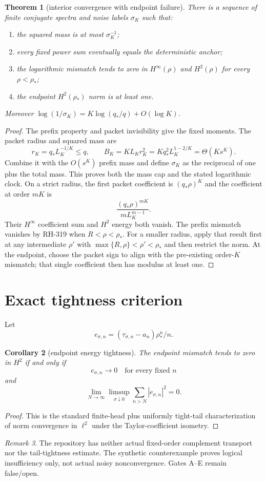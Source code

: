 \documentclass[11pt]{article}
\newtheorem{theorem}{Theorem}[section]
\newtheorem{corollary}[theorem]{Corollary}
\theoremstyle{remark}\newtheorem{remark}[theorem]{Remark}
\begin{document}
\begin{theorem}[interior convergence with endpoint failure]
There is a sequence of finite conjugate spectra and noise labels $\sigma_K$
such that:
\begin{enumerate}
\item the squared mass is at most $\sigma_K^{-1}$;
\item every fixed power sum eventually equals the deterministic anchor;
\item the logarithmic mismatch tends to zero in $H^\infty(\rho)$ and
      $H^2(\rho)$ for every $\rho<\rho_*$;
\item the endpoint $H^2(\rho_*)$ norm is at least one.
\end{enumerate}
Moreover
$\log(1/\sigma_K)=K\log(q_*/q)+O(\log K)$.
\end{theorem}
\begin{proof}
The prefix property and packet invisibility give the fixed moments.  The
packet radius and squared mass are
\[
 r_K=q_*L_K^{-1/K}\le q,\qquad
 B_K=KL_Kr_K^2=Kq_*^2L_K^{1-2/K}=\Theta(Ks^K).
\]
Combine it with the $O(s^K)$ prefix mass and define $\sigma_K$ as the
reciprocal of one plus the total mass.  This proves both the mass cap and the
stated logarithmic clock.  On a strict radius, the first packet coefficient
is $(q_*\rho)^K$ and the coefficient at order $mK$ is
\[
 \frac{(q_*\rho)^{mK}}{mL_K^{m-1}}.
\]
Their $H^\infty$ coefficient sum and $H^2$ energy both vanish.  The prefix
mismatch vanishes by RH-319 when $R<\rho<\rho_*$.  For a smaller radius,
apply that result first at any intermediate $\rho'$ with
$\max\{R,\rho\}<\rho'<\rho_*$ and then restrict the norm.  At the endpoint,
choose the packet sign to align with the pre-existing order-$K$ mismatch;
that single coefficient then has modulus at least one.
\end{proof}

\section{Exact tightness criterion}
Let
\[
 e_{\sigma,n}=(\tau_{\sigma,n}-a_n)\rho_*^n/n.
\]
\begin{corollary}[endpoint energy tightness]
The endpoint mismatch tends to zero in $H^2$ if and only if
\[
 e_{\sigma,n}\to0\quad\text{for every fixed }n
\]
and
\[
 \lim_{N\to\infty}\limsup_{\sigma\downarrow0}
 \sum_{n>N}|e_{\sigma,n}|^2=0.
\]
\end{corollary}
\begin{proof}
This is the standard finite-head plus uniformly tight-tail characterization
of norm convergence in $\ell^2$ under the Taylor-coefficient isometry.
\end{proof}

\begin{remark}
The repository has neither actual fixed-order complement transport nor the
tail-tightness estimate.  The synthetic counterexample proves logical
insufficiency only, not actual noisy nonconvergence.  Gates A--E remain
false/open.
\end{remark}
\end{document}
